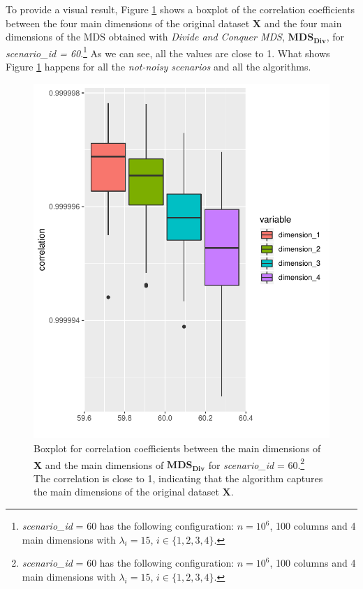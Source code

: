 \documentclass[11pt]{report}
\begin{document}
\indent To provide a visual result, Figure \ref{divide_correlation_scenario_60} 
shows a boxplot of the correlation coefficients between the four main 
dimensions of the original dataset \textbf{X} and the four main dimensions 
of the MDS obtained with \textit{Divide and Conquer MDS}, $\mathbf{MDS_{Div}}$, 
for \textit{scenario\_id = 60}.\footnote{\textit{scenario\_id} = 60 
has the following configuration: $n=10^6$, 100 columns and 4 main dimensions 
with $\lambda_i = 15$, $i \in \{1, 2, 3, 4 \}$.\label{s60}} 
As we can see, all the values are close to 1. What shows Figure 
\ref{divide_correlation_scenario_60} happens for all the 
\textit{not-noisy scenarios} and all the algorithms. 

\begin{figure}
\begin{minipage}{\textwidth}
    \includegraphics[scale = 1.2]{./images/example_corr_divide.pdf}
    \caption[sss]{
    Boxplot for correlation coefficients between the main dimensions of \textbf{X} 
    and the main dimensions of $\mathbf{MDS_{Div}}$ for
    \textit{scenario\_id } = 60.\footnote{\textit{scenario\_id} = 60 
    has the following configuration: $n=10^6$, 100 columns and 4 main dimensions 
    with $\lambda_i = 15$, $i \in \{1, 2, 3, 4 \}$.}  \\
    The correlation is close to 1, indicating that the algorithm captures 
    the main dimensions of the original dataset \textbf{X}.
    }
    \label{divide_correlation_scenario_60}
\end{minipage}
\end{figure}
\end{document}
